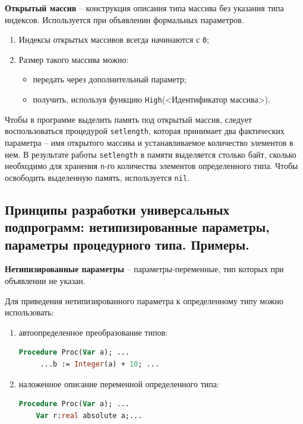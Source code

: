 {\bf Открытый массив} – конструкция описания типа массива без указания типа индексов. Используется при объявлении формальных параметров.

\begin{enumerate}
    \item Индексы открытых массивов всегда начинаются с \texttt{0};

    \item Размер такого массива можно:
        \begin{itemize}
        \item передать через дополнительный параметр;
        \item получить, используя функцию \texttt{High}(<Идентификатор массива>).
        \end{itemize}
\end{enumerate}

Чтобы в программе выделить память под открытый массив, следует воспользоваться процедурой \texttt{setlength}, которая принимает два фактических параметра – имя открытого массива и устанавливаемое количество элементов в нем. В результате работы \texttt{setlength} в памяти выделяется столько байт, сколько необходимо для хранения \texttt{n}-го количества элементов определенного типа. Чтобы освободить выделенную память, используется \texttt{nil}.







\newpage\subsection{Принципы разработки универсальных подпрограмм:  нетипизированные параметры, параметры процедурного типа. Примеры. }


\begin{myquote}
            
\end{myquote}

{\bf Нетипизированные параметры} – параметры-переменные, тип которых при объявлении не указан.

\noindent
Для приведения нетипизированного параметра к определенному типу можно использовать:

\begin{enumerate}
\item автоопределенное преобразование типов:
\begin{lstlisting}[language = pascal]
 	Procedure Proc(Var a); ...
  	 ...b := Integer(а) + 10; ...
\end{lstlisting}

\item наложенное описание переменной определенного типа:
\begin{lstlisting}[language = pascal]
 	Procedure Proc(Var a); ...
    Var r:real absolute a;...
\end{lstlisting}
\end{enumerate}

